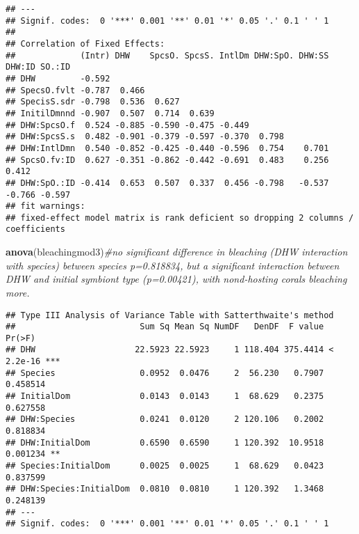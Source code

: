 \documentclass[]{article}
\newenvironment{Shaded}{\begin{snugshade}}{\end{snugshade}}
\newcommand{\CommentTok}[1]{\textcolor[rgb]{0.56,0.35,0.01}{\textit{#1}}}
\newcommand{\DataTypeTok}[1]{\textcolor[rgb]{0.13,0.29,0.53}{#1}}
\newcommand{\DecValTok}[1]{\textcolor[rgb]{0.00,0.00,0.81}{#1}}
\newcommand{\KeywordTok}[1]{\textcolor[rgb]{0.13,0.29,0.53}{\textbf{#1}}}
\newcommand{\NormalTok}[1]{#1}
\newcommand{\OperatorTok}[1]{\textcolor[rgb]{0.81,0.36,0.00}{\textbf{#1}}}
\newcommand{\StringTok}[1]{\textcolor[rgb]{0.31,0.60,0.02}{#1}}
\begin{document}
\begin{verbatim}
## ---
## Signif. codes:  0 '***' 0.001 '**' 0.01 '*' 0.05 '.' 0.1 ' ' 1
## 
## Correlation of Fixed Effects:
##             (Intr) DHW    SpcsO. SpcsS. IntlDm DHW:SpO. DHW:SS DHW:ID SO.:ID
## DHW         -0.592                                                          
## SpecsO.fvlt -0.787  0.466                                                   
## SpecisS.sdr -0.798  0.536  0.627                                            
## InitilDmnnd -0.907  0.507  0.714  0.639                                     
## DHW:SpcsO.f  0.524 -0.885 -0.590 -0.475 -0.449                              
## DHW:SpcsS.s  0.482 -0.901 -0.379 -0.597 -0.370  0.798                       
## DHW:IntlDmn  0.540 -0.852 -0.425 -0.440 -0.596  0.754    0.701              
## SpcsO.fv:ID  0.627 -0.351 -0.862 -0.442 -0.691  0.483    0.256  0.412       
## DHW:SpO.:ID -0.414  0.653  0.507  0.337  0.456 -0.798   -0.537 -0.766 -0.597
## fit warnings:
## fixed-effect model matrix is rank deficient so dropping 2 columns / coefficients
\end{verbatim}

\begin{Shaded}
\begin{Highlighting}[]
  \KeywordTok{anova}\NormalTok{(bleachingmod3)}\CommentTok{#no significant difference in bleaching (DHW interaction with species) between species p=0.818834, but a significant interaction between DHW and initial symbiont type (p=0.00421), with nond-hosting corals bleaching more. }
\end{Highlighting}
\end{Shaded}

\begin{verbatim}
## Type III Analysis of Variance Table with Satterthwaite's method
##                         Sum Sq Mean Sq NumDF   DenDF  F value    Pr(>F)    
## DHW                    22.5923 22.5923     1 118.404 375.4414 < 2.2e-16 ***
## Species                 0.0952  0.0476     2  56.230   0.7907  0.458514    
## InitialDom              0.0143  0.0143     1  68.629   0.2375  0.627558    
## DHW:Species             0.0241  0.0120     2 120.106   0.2002  0.818834    
## DHW:InitialDom          0.6590  0.6590     1 120.392  10.9518  0.001234 ** 
## Species:InitialDom      0.0025  0.0025     1  68.629   0.0423  0.837599    
## DHW:Species:InitialDom  0.0810  0.0810     1 120.392   1.3468  0.248139    
## ---
## Signif. codes:  0 '***' 0.001 '**' 0.01 '*' 0.05 '.' 0.1 ' ' 1
\end{verbatim}

\begin{Shaded}
\end{Shaded}
\end{document}
